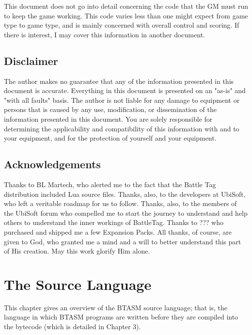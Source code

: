 \documentclass[12pt,a4paper]{scrbook}
\begin{document}
This document does not go into detail concerning the code that the GM must run to keep the
game working.  This code varies less than one might expect from game type to game type, and is
mainly concerned with overall control and scoring.  If there is interest, I may cover this
information in another document. 
 
 
\section*{Disclaimer}

The author makes no
guarantee that any of the information presented in this document is accurate.  
Everything in this document is presented on an "as-is" and "with all faults" basis.  The 
author is not liable
for any damage to equipment or persons that is caused by any use, modification, or 
dissemination of the information presented in this document.  You
are solely responsible for determining the applicability and compatibility of this
information with and to your equipment, and for the protection of yourself and your 
equipment.

\section*{Acknowledgements}

Thanks to BL Martech, who alerted me to the fact that the Battle Tag distribution included
Lua source files.  Thanks, also, to the developers at UbiSoft, who left a veritable roadmap for
us to follow.  
Thanks, also, to the members of the UbiSoft forum who compelled me to start the journey to understand
and help others to understand the inner workings of BattleTag.
Thanks to ??? who purchased and shipped me a few Expansion Packs.
All thanks, of course, are given to God, who granted me a mind and a will to better
understand this part of His creation.  May this work glorify Him alone.


\rohead {\thepage}
\lohead {\rightmark}
\rehead {\leftmark}
\lehead {\thepage}

\mainmatter

\chapter{The Source Language}

This chapter gives an overview of the BTASM source language; that is, the language in which
BTASM programs are written before they are compiled into the bytecode (which is detailed in 
Chapter 3).
\end{document}

